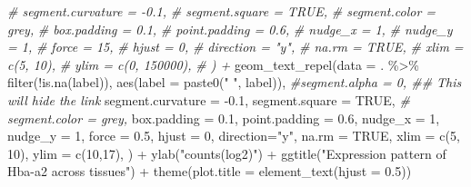 \documentclass[
]{article}
\newenvironment{Shaded}{\begin{snugshade}}{\end{snugshade}}
\newcommand{\AttributeTok}[1]{\textcolor[rgb]{0.77,0.63,0.00}{#1}}
\newcommand{\CommentTok}[1]{\textcolor[rgb]{0.56,0.35,0.01}{\textit{#1}}}
\newcommand{\ConstantTok}[1]{\textcolor[rgb]{0.00,0.00,0.00}{#1}}
\newcommand{\DecValTok}[1]{\textcolor[rgb]{0.00,0.00,0.81}{#1}}
\newcommand{\FloatTok}[1]{\textcolor[rgb]{0.00,0.00,0.81}{#1}}
\newcommand{\FunctionTok}[1]{\textcolor[rgb]{0.00,0.00,0.00}{#1}}
\newcommand{\NormalTok}[1]{#1}
\newcommand{\SpecialCharTok}[1]{\textcolor[rgb]{0.00,0.00,0.00}{#1}}
\newcommand{\StringTok}[1]{\textcolor[rgb]{0.31,0.60,0.02}{#1}}
\begin{document}
\begin{Shaded}
\begin{Highlighting}[]
  \CommentTok{\#   segment.curvature = {-}0.1,}
  \CommentTok{\#   segment.square = TRUE,}
  \CommentTok{\#   segment.color = \textquotesingle{}grey\textquotesingle{},}
  \CommentTok{\#   box.padding = 0.1,}
  \CommentTok{\#   point.padding = 0.6,}
  \CommentTok{\#   nudge\_x = 1,}
  \CommentTok{\#   nudge\_y = 1,}
  \CommentTok{\#   force = 15,}
  \CommentTok{\#   hjust = 0,}
  \CommentTok{\#   direction = "y",}
  \CommentTok{\#   na.rm = TRUE,}
  \CommentTok{\#   xlim = c(5, 10),}
  \CommentTok{\#   ylim = c(0, 150000),}
  \CommentTok{\# ) +}
  \FunctionTok{geom\_text\_repel}\NormalTok{(}\AttributeTok{data =}\NormalTok{ . }\SpecialCharTok{\%\textgreater{}\%} \FunctionTok{filter}\NormalTok{(}\SpecialCharTok{!}\FunctionTok{is.na}\NormalTok{(label)),}
                  \FunctionTok{aes}\NormalTok{(}\AttributeTok{label =} \FunctionTok{paste0}\NormalTok{(}\StringTok{"  "}\NormalTok{, label)),}
                  \CommentTok{\#segment.alpha = 0, \#\# This will \textquotesingle{}hide\textquotesingle{} the link}
                  \AttributeTok{segment.curvature =} \SpecialCharTok{{-}}\FloatTok{0.1}\NormalTok{,}
                  \AttributeTok{segment.square =} \ConstantTok{TRUE}\NormalTok{,}
                  \CommentTok{\# segment.color = \textquotesingle{}grey\textquotesingle{},}
                  \AttributeTok{box.padding =} \FloatTok{0.1}\NormalTok{,}
                  \AttributeTok{point.padding =} \FloatTok{0.6}\NormalTok{,}
                  \AttributeTok{nudge\_x =} \DecValTok{1}\NormalTok{,}
                  \AttributeTok{nudge\_y =} \DecValTok{1}\NormalTok{,}
                 \AttributeTok{force =} \FloatTok{0.5}\NormalTok{,}
                  \AttributeTok{hjust =} \DecValTok{0}\NormalTok{,}
                  \AttributeTok{direction=}\StringTok{"y"}\NormalTok{,}
                  \AttributeTok{na.rm =} \ConstantTok{TRUE}\NormalTok{, }
                  \AttributeTok{xlim =} \FunctionTok{c}\NormalTok{(}\DecValTok{5}\NormalTok{, }\DecValTok{10}\NormalTok{),}
                  \AttributeTok{ylim =} \FunctionTok{c}\NormalTok{(}\DecValTok{10}\NormalTok{,}\DecValTok{17}\NormalTok{),}
\NormalTok{)                   }\SpecialCharTok{+}
  \FunctionTok{ylab}\NormalTok{(}\StringTok{"counts(log2)"}\NormalTok{) }\SpecialCharTok{+} \FunctionTok{ggtitle}\NormalTok{(}\StringTok{"Expression pattern of Hba{-}a2 across tissues"}\NormalTok{) }\SpecialCharTok{+} \FunctionTok{theme}\NormalTok{(}\AttributeTok{plot.title =} \FunctionTok{element\_text}\NormalTok{(}\AttributeTok{hjust =} \FloatTok{0.5}\NormalTok{))}
\end{Highlighting}
\end{Shaded}
\end{document}
